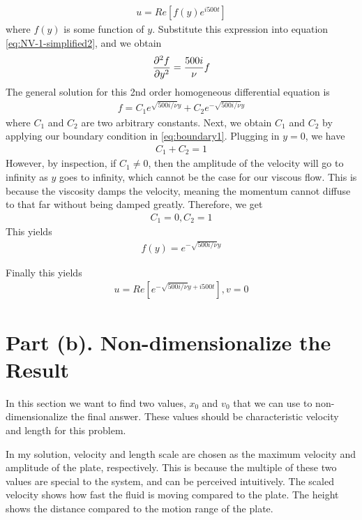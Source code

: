 \documentclass{article}
\begin{document}
\begin{align}
u = Re[f(y)e^{i500t}] \label{eq:v=0}
\end{align}
where $f(y)$ is some function of $y$. Substitute this expression into equation \ref{eq:NV-1-simplified2}, and we obtain
\begin{align}
\pdv[2]{f}{y} = \frac{500i}{\nu}f \label{eq:fyeq}
\end{align}
The general solution for this 2nd order homogeneous differential equation is 
\begin{align}
f = C_1 e^{\sqrt{500i/\nu}y} + C_2 e^{-\sqrt{500i/\nu}y}\label{eq:generalSoln}
\end{align} where $C_1$ and $C_2$ are two arbitrary constants. Next, we obtain $C_1$ and $C_2$ by applying our boundary condition in \ref{eq:boundary1}. Plugging in $y = 0$, we have
\begin{align}
C_1 + C_2 = 1
\end{align}
 However, by inspection, if $C_1 \neq 0$, then the amplitude of the velocity will go to infinity as $y$ goes to infinity, which cannot be the case for our viscous flow. This is because the viscosity damps the velocity, meaning the momentum cannot diffuse to that far without being damped greatly. Therefore, we get
\begin{align}
C_1 = 0, C_2 = 1
\end{align}
This yields
\begin{align}
f(y) = e^{-\sqrt{500i/\nu}y} \label{eq:fy}
\end{align}

Finally this yields
\begin{align}
u = Re[e^{-\sqrt{500i/\nu}y + i500t}], v = 0
\end{align}

\section{Part (b). Non-dimensionalize the Result}
In this section we want to find two values, $x_0$ and $v_0$ that we can use to non-dimensionalize the final answer. These values should be characteristic velocity and length for this problem.

In my solution, velocity and length scale are chosen as the maximum velocity and amplitude of the plate, respectively. This is because the multiple of these two values are special to the system, and can be perceived intuitively. The scaled velocity shows how fast the fluid is moving compared to the plate. The height shows the distance compared to the motion range of the plate.
\end{document}
